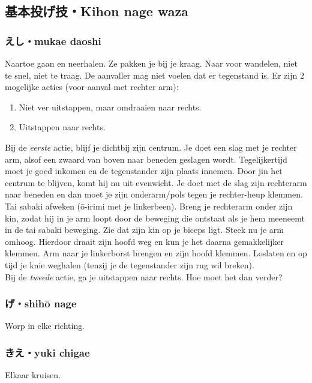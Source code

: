 \subsection{基本投げ技・Kihon nage waza}
\subsubsection{えし・mukae daoshi}
Naartoe gaan en neerhalen. Ze pakken je bij je kraag. Naar voor wandelen, niet te snel, niet te traag. De aanvaller mag niet voelen dat er tegenstand is. Er zijn 2 mogelijke acties (voor aanval met rechter arm):\\
\begin{enumerate}
    \item{Niet ver uitstappen, maar omdraaien naar rechts.}
    \item{Uitstappen naar rechts.}
\end{enumerate}
Bij de \textit{eerste} actie, blijf je dichtbij zijn centrum. Je doet een slag met je rechter arm, alsof een zwaard van boven naar beneden geslagen wordt. Tegelijkertijd moet je goed inkomen en de tegenstander zijn plaats innemen. Door jin het centrum te blijven, komt hij nu uit evenwicht. Je doet met de slag zijn rechterarm naar beneden en dan moet je zijn onderarm/pols tegen je rechter-heup klemmen. Tai sabaki afweken (\={o}-irimi met je linkerbeen). Breng je rechterarm onder zijn kin, zodat hij in je arm loopt door de beweging die ontstaat als je hem meeneemt in de tai sabaki beweging. Zie dat zijn kin op je biceps ligt. Steek nu je arm omhoog. Hierdoor draait zijn hoofd weg en kun je het daarna gemakkelijker klemmen. Arm naar je linkerborst brengen en zijn hoofd klemmen. Loslaten en op tijd je knie weghalen (tenzij je de tegenstander zijn rug wil breken).\\
Bij de \textit{tweede} actie, ga je uitstappen naar rechts. Hoe moet het dan verder?


\subsubsection{げ・shih\={o} nage}
Worp in elke richting.

\subsubsection{きえ・yuki chigae}
Elkaar kruisen.


